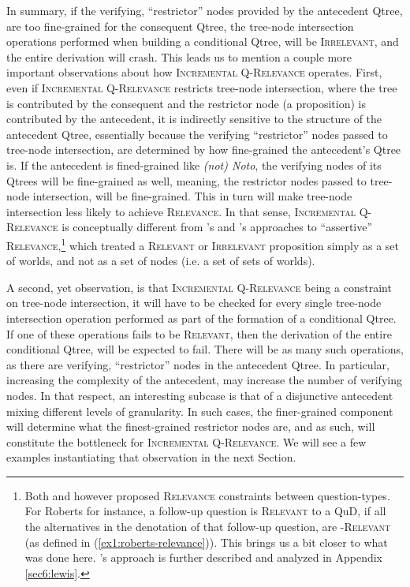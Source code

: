 In summary, if the verifying, ``restrictor'' nodes provided by the antecedent Qtree, are too fine-grained for the consequent Qtree, the tree-node intersection operations performed when building a conditional Qtree, will be \textsc{Irrelevant}, and the entire derivation will crash. This leads us to mention a couple more important observations about how \textsc{Incremental Q-Relevance} operates. First, even if \textsc{Incremental Q-Relevance} restricts tree-node intersection, where the tree is contributed by the consequent and the restrictor node (a proposition) is contributed by the antecedent, it is indirectly sensitive to the structure of the antecedent Qtree, essentially because the verifying ``restrictor'' nodes passed to tree-node intersection, are determined by how fine-grained the antecedent's Qtree is. If the antecedent is fined-grained like \textit{(not) Noto}, the verifying nodes of its Qtrees will be fine-grained as well, meaning, the restrictor nodes passed to tree-node intersection, will be fine-grained. This in turn will make tree-node intersection less likely to achieve \textsc{Relevance}. In that sense, \textsc{Incremental Q-Relevance} is conceptually different from \citeauthor*{Lewis1988}'s and \textcite{Roberts2012}'s approaches to ``assertive'' \textsc{Relevance},\footnote{Both \citeauthor*{Lewis1988} and \textcite{Roberts2012} however proposed \textsc{Relevance} constraints between question-types. For Roberts for instance, a follow-up question is \textsc{Relevant} to a QuD, if all the alternatives in the denotation of that follow-up question, are \textsc{\citeauthor{Roberts2012}-Relevant} (as defined in (\ref{ex1:roberts-relevance})). This brings us a bit closer to what was done here. \citeauthor*{Lewis1988}'s approach is further described and analyzed in Appendix \ref{sec6:lewis}.} which treated a \textsc{Relevant} or \textsc{Irrelevant} proposition simply as a set of worlds, and not as a set of nodes (i.e. a set of sets of worlds).

A second, yet observation, is that \textsc{Incremental Q-Relevance} being a constraint on tree-node intersection, it will have to be checked for every single tree-node intersection operation performed as part of the formation of a conditional Qtree. If one of these operations fails to be \textsc{Relevant}, then the derivation of the entire conditional Qtree, will be expected to fail. There will be as many such operations, as there are verifying, ``restrictor'' nodes in the antecedent Qtree. In particular, increasing the complexity of the antecedent, may increase the number of verifying nodes. In that respect, an interesting subcase is that of a disjunctive antecedent mixing different levels of granularity. In such cases, the finer-grained component will determine what the finest-grained restrictor nodes are, and as such, will constitute the bottleneck for \textsc{Incremental Q-Relevance}. We will see a few examples instantiating that observation in the next Section.


